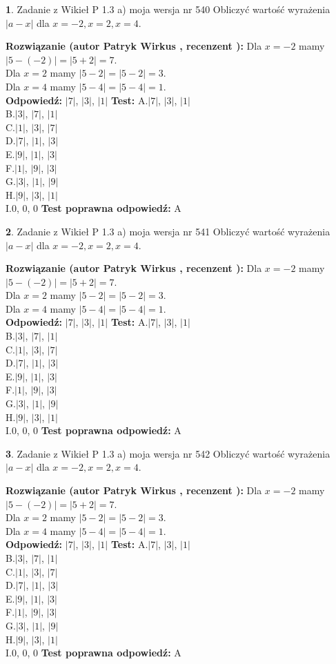 \documentclass[12pt, a4paper]{article}
\theoremstyle{definition} %
\newtheorem{zad}{}
\newcommand{\zadStart}[1]{\begin{zad}#1\newline}
\newcommand{\zadStop}{\end{zad}}
\newcommand{\rozwStart}[2]{\noindent \textbf{Rozwiązanie (autor #1 , recenzent #2): }\newline}
\newcommand{\rozwStop}{\newline}
\newcommand{\odpStart}{\noindent \textbf{Odpowiedź:}\newline}
\newcommand{\odpStop}{\newline}
\newcommand{\testStart}{\noindent \textbf{Test:}\newline}
\newcommand{\testStop}{\newline}
\newcommand{\kluczStart}{\noindent \textbf{Test poprawna odpowiedź:}\newline}
\newcommand{\kluczStop}{\newline}
\begin{document}
\zadStart{Zadanie z Wikieł P 1.3 a) moja wersja nr 540}
Obliczyć wartość wyrażenia $|a - x|$ dla $x=-2,x=2,x=4$.
\zadStop
\rozwStart{Patryk Wirkus}{}
Dla $x = -2$ mamy $|5 - (-2)| = |5 + 2| = 7$.\\
Dla $x = 2$ mamy $|5 - 2| = |5 - 2| = 3$.\\
Dla $x = 4$ mamy $|5 - 4| = |5 - 4| = 1$.\\
\rozwStop
\odpStart
$|7|$, $|3|$, $|1|$
\odpStop
\testStart
A.$|7|$, $|3|$, $|1|$\\
B.$|3|$, $|7|$, $|1|$\\
C.$|1|$, $|3|$, $|7|$\\
D.$|7|$, $|1|$, $|3|$\\
E.$|9|$, $|1|$, $|3|$\\
F.$|1|$, $|9|$, $|3|$\\
G.$|3|$, $|1|$, $|9|$\\
H.$|9|$, $|3|$, $|1|$\\
I.$0$, $0$, $0$
\testStop
\kluczStart
A
\kluczStop



\zadStart{Zadanie z Wikieł P 1.3 a) moja wersja nr 541}
Obliczyć wartość wyrażenia $|a - x|$ dla $x=-2,x=2,x=4$.
\zadStop
\rozwStart{Patryk Wirkus}{}
Dla $x = -2$ mamy $|5 - (-2)| = |5 + 2| = 7$.\\
Dla $x = 2$ mamy $|5 - 2| = |5 - 2| = 3$.\\
Dla $x = 4$ mamy $|5 - 4| = |5 - 4| = 1$.\\
\rozwStop
\odpStart
$|7|$, $|3|$, $|1|$
\odpStop
\testStart
A.$|7|$, $|3|$, $|1|$\\
B.$|3|$, $|7|$, $|1|$\\
C.$|1|$, $|3|$, $|7|$\\
D.$|7|$, $|1|$, $|3|$\\
E.$|9|$, $|1|$, $|3|$\\
F.$|1|$, $|9|$, $|3|$\\
G.$|3|$, $|1|$, $|9|$\\
H.$|9|$, $|3|$, $|1|$\\
I.$0$, $0$, $0$
\testStop
\kluczStart
A
\kluczStop



\zadStart{Zadanie z Wikieł P 1.3 a) moja wersja nr 542}
Obliczyć wartość wyrażenia $|a - x|$ dla $x=-2,x=2,x=4$.
\zadStop
\rozwStart{Patryk Wirkus}{}
Dla $x = -2$ mamy $|5 - (-2)| = |5 + 2| = 7$.\\
Dla $x = 2$ mamy $|5 - 2| = |5 - 2| = 3$.\\
Dla $x = 4$ mamy $|5 - 4| = |5 - 4| = 1$.\\
\rozwStop
\odpStart
$|7|$, $|3|$, $|1|$
\odpStop
\testStart
A.$|7|$, $|3|$, $|1|$\\
B.$|3|$, $|7|$, $|1|$\\
C.$|1|$, $|3|$, $|7|$\\
D.$|7|$, $|1|$, $|3|$\\
E.$|9|$, $|1|$, $|3|$\\
F.$|1|$, $|9|$, $|3|$\\
G.$|3|$, $|1|$, $|9|$\\
H.$|9|$, $|3|$, $|1|$\\
I.$0$, $0$, $0$
\testStop
\kluczStart
A
\kluczStop
\end{document}
